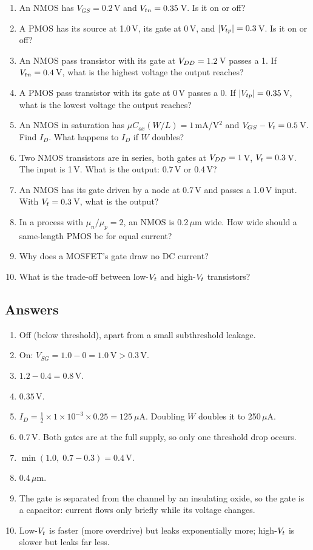 \begin{enumerate}
  \item An NMOS has $V_{GS} = 0.2$\,V and $V_{tn} = 0.35$\,V. Is it on or off?
  \item A PMOS has its source at 1.0\,V, its gate at 0\,V, and $|V_{tp}| = 0.3$\,V. Is it on or off?
  \item An NMOS pass transistor with its gate at $V_{DD} = 1.2$\,V passes a 1. If $V_{tn} = 0.4$\,V, what is the highest voltage the output reaches?
  \item A PMOS pass transistor with its gate at 0\,V passes a 0. If $|V_{tp}| = 0.35$\,V, what is the lowest voltage the output reaches?
  \item An NMOS in saturation has $\mu C_{ox}(W/L) = 1$\,mA/V$^2$ and $V_{GS} - V_{t} = 0.5$\,V. Find $I_D$. What happens to $I_D$ if $W$ doubles?
  \item Two NMOS transistors are in series, both gates at $V_{DD} = 1$\,V, $V_{t} = 0.3$\,V. The input is 1\,V. What is the output: 0.7\,V or 0.4\,V?
  \item An NMOS has its gate driven by a node at 0.7\,V and passes a 1.0\,V input. With $V_{t} = 0.3$\,V, what is the output?
  \item In a process with $\mu_n/\mu_p = 2$, an NMOS is 0.2\,$\mu$m wide. How wide should a same-length PMOS be for equal current?
  \item Why does a MOSFET's gate draw no DC current?
  \item What is the trade-off between low-$V_{t}$ and high-$V_{t}$ transistors?
\end{enumerate}

\subsection*{Answers}
\begin{enumerate}
  \item Off (below threshold), apart from a small subthreshold leakage.
  \item On: $V_{SG} = 1.0 - 0 = 1.0~\text{V} > 0.3$\,V.
  \item $1.2 - 0.4 = 0.8$\,V.
  \item $0.35$\,V.
  \item $I_D = \tfrac12 \times 1\times10^{-3} \times 0.25 = 125~\mu$A. Doubling $W$ doubles it to 250\,$\mu$A.
  \item 0.7\,V. Both gates are at the full supply, so only one threshold drop occurs.
  \item $\min(1.0,\; 0.7 - 0.3) = 0.4$\,V.
  \item 0.4\,$\mu$m.
  \item The gate is separated from the channel by an insulating oxide, so the gate is a capacitor: current flows only briefly while its voltage changes.
  \item Low-$V_{t}$ is faster (more overdrive) but leaks exponentially more; high-$V_{t}$ is slower but leaks far less.
\end{enumerate}

